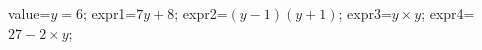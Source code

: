\documentclass[exercice]{thedocument}%
\begin{document}
%
\>value=$y=6$;%
\>expr1=$7y+8$;%
\>expr2=$(y-1)(y+1)$;%
\>expr3=$y\times y$;%
\>expr4=$27-2\times y$;%
%
\end{document}
